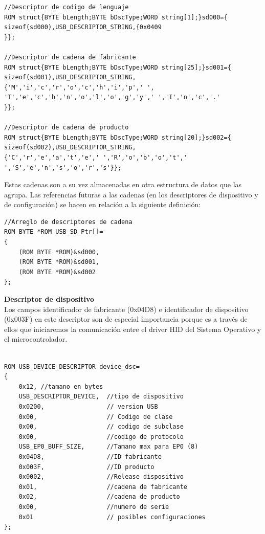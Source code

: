 \documentclass[letterpaper,openright,12pt]{book}
\begin{document}
\begin{lstlisting}
//Descriptor de codigo de lenguaje
ROM struct{BYTE bLength;BYTE bDscType;WORD string[1];}sd000={
sizeof(sd000),USB_DESCRIPTOR_STRING,{0x0409
}};

//Descriptor de cadena de fabricante
ROM struct{BYTE bLength;BYTE bDscType;WORD string[25];}sd001={
sizeof(sd001),USB_DESCRIPTOR_STRING,
{'M','i','c','r','o','c','h','i','p',' ',
'T','e','c','h','n','o','l','o','g','y',' ','I','n','c','.'
}};

//Descriptor de cadena de producto
ROM struct{BYTE bLength;BYTE bDscType;WORD string[20];}sd002={
sizeof(sd002),USB_DESCRIPTOR_STRING,
{'C','r','e','a','t','e',' ','R','o','b','o','t',' ','S','e','n','s','o','r','s'}};

\end{lstlisting}
Estas cadenas son a su vez almacenadas en otra estructura de datos que las agrupa. Las referencias futuras a las cadenas (en los descriptores de dispositivo y de configuración) se hacen en relación a la siguiente definición:
\begin{lstlisting}
//Arreglo de descriptores de cadena
ROM BYTE *ROM USB_SD_Ptr[]=
{
    (ROM BYTE *ROM)&sd000,
    (ROM BYTE *ROM)&sd001,
    (ROM BYTE *ROM)&sd002
};
\end{lstlisting}
\textbf{Descriptor de dispositivo}\\
Los campos identificador de fabricante (0x04D8) e identificador de dispositivo (0x003F) en este descriptor son de especial importancia porque es a través de ellos que iniciaremos la comunicación entre el driver HID del Sistema Operativo y el microcontrolador. 
\begin{lstlisting}

ROM USB_DEVICE_DESCRIPTOR device_dsc=
{
    0x12, //tamano en bytes
    USB_DESCRIPTOR_DEVICE,  //tipo de dispositivo
    0x0200,                 // version USB
    0x00,                   // Codigo de clase
    0x00,                   // codigo de subclase
    0x00,                   //codigo de protocolo
    USB_EP0_BUFF_SIZE,      //Tamano max para EP0 (8)
    0x04D8,                 //ID fabricante 
    0x003F,                 //ID producto 
    0x0002,                 //Release dispositivo
    0x01,                   //cadena de fabricante
    0x02,                   //cadena de producto
    0x00,                   //numero de serie
    0x01                    // posibles configuraciones
};
\end{lstlisting}
\end{document}
